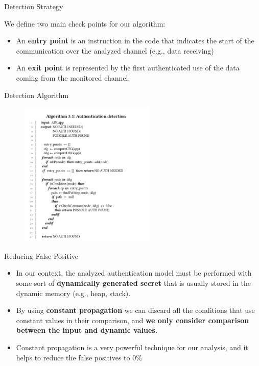 \documentclass[10pt]{beamer}
\begin{document}
\begin{frame}[fragile]{Detection Strategy}

  We define two main check points for our algorithm:
  \begin{itemize}

  \item An {\bf entry point} is an instruction in the code that
      indicates the start of the communication over the analyzed
      channel (e.g., data receiving)

    \item An {\bf exit point} is represented by the first
      authenticated use of the data coming from the monitored channel.

   \end{itemize}
  
\end{frame}

\begin{frame}[fragile]{Detection Algorithm}

 \begin{figure}[bhp]
    \centering
	\includegraphics[width=65mm]{img/algo}
     \end{figure}
  
\end{frame}

\begin{frame}[fragile]{Reducing False Positive}

  \begin{itemize}

  \item In our context, the analyzed authentication model must be
    performed with some sort of {\bf dynamically generated secret}
    that is usually stored in the dynamic memory (e.g., heap, stack).

  \item By using {\bf constant propagation} we can discard all the
    conditions that use constant values in their comparison, and {\bf
      we only consider comparison between the input and dynamic
      values.}

  \item Constant propagation is a very powerful technique for our
    analysis, and it helps to reduce the false positives to 0\%


  \end{itemize}
  
\end{frame}
\end{document}
